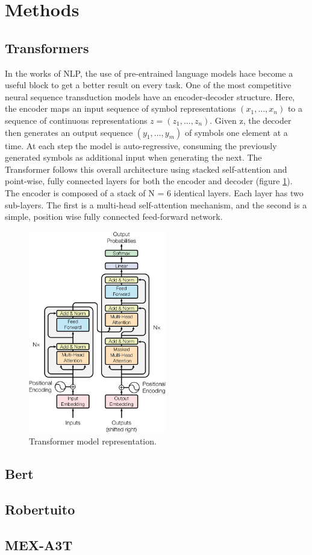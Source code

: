 \section{Methods}

\subsection{Transformers}

In the works of NLP, the use of pre-entrained language models hace become a useful block to get a better result on every task. One of the most competitive neural sequence transduction models have an encoder-decoder structure\cite{Bahdanau_2014,Cho_2014}. Here, the encoder maps an input sequence of symbol representations $(x_1 , \dots, x_n)$ to a sequence of continuous representations $z = (z_1 , \dots, z_n )$. Given z, the decoder then generates an output sequence $(y_1 , \dots, y_m )$ of symbols one element at a time. At each step the model is auto-regressive\cite{Graves_2013}, consuming the previously generated symbols as additional input when generating the next. The Transformer follows this overall architecture using stacked self-attention and point-wise, fully connected layers for both the encoder and decoder (figure \ref{fig:transformer}). The encoder is composed of a stack of N = 6 identical layers. Each layer has two sub-layers. The first is a multi-head self-attention mechanism, and the second is a simple, position wise fully connected feed-forward network.

\begin{figure}[H]
    \centering
    \includegraphics[width=6cm]{Graphics/transformer.png}
    \caption{Transformer model representation\cite{Vaswani_2017}.}
    \label{fig:transformer}
\end{figure}

\subsection{Bert}

\subsection{Robertuito}

\subsection{MEX-A3T}

